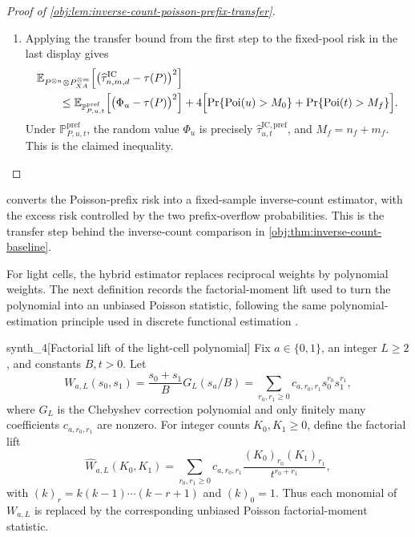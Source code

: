 \documentclass[11pt]{article}
\begin{document}
\begin{proof}[Proof of \cref{obj:lem:inverse-count-poisson-prefix-transfer}]
\begin{enumerate}
\item
Applying the transfer bound from the first step to the fixed-pool risk in the last display gives
\[
\begin{aligned}
&\mathbb E_{P^{\otimes n}\otimes P_{XA}^{\otimes m}}
 \!\left[
  \bigl(\widehat\tau^{\mathrm{IC}}_{n,m,d}-\tau(P)\bigr)^2
 \right] \\
&\qquad\le
\mathbb E_{\mathbb P^{\mathrm{pref}}_{P,u,t}}
 \!\left[
  \bigl(\Phi_u-\tau(P)\bigr)^2
 \right]
+4\Bigl[
  \Pr\{\operatorname{Poi}(u)>M_0\}
  +
  \Pr\{\operatorname{Poi}(t)>M_f\}
\Bigr].
\end{aligned}
\]
Under \(\mathbb P^{\mathrm{pref}}_{P,u,t}\), the random value \(\Phi_u\) is precisely
\(\widehat\tau^{\mathrm{IC,pref}}_{u,t}\), and \(M_f=n_f+m_f\). This is the claimed inequality.
\end{enumerate}
\end{proof}

 converts the Poisson-prefix risk into a fixed-sample inverse-count estimator, with the excess risk controlled by the two prefix-overflow probabilities. This is the transfer step behind the inverse-count comparison in \cref{obj:thm:inverse-count-baseline}.

For light cells, the hybrid estimator replaces reciprocal weights by polynomial weights. The next definition records the factorial-moment lift used to turn the polynomial into an unbiased Poisson statistic, following the same polynomial-estimation principle used in discrete functional estimation \citep{JiaoVenkatHanWeissman2015,WuYang2016,ValiantValiant2017,OrlitskySureshWu2016}.

\begin{definitionv}{synth_4}[Factorial lift of the light-cell polynomial]
Fix \(a\in\{0,1\}\), an integer \(L\ge2\), and constants \(B,t>0\). Let
\[
W_{a,L}(s_0,s_1)
=
\frac{s_0+s_1}{B}G_L(s_a/B)
=
\sum_{r_0,r_1\ge0}c_{a,r_0,r_1}s_0^{r_0}s_1^{r_1},
\]
where \(G_L\) is the Chebyshev correction polynomial and only finitely many coefficients \(c_{a,r_0,r_1}\) are nonzero. For integer counts \(K_0,K_1\ge0\), define the factorial lift
\[
\widehat W_{a,L}(K_0,K_1)
=
\sum_{r_0,r_1\ge0}
c_{a,r_0,r_1}
\frac{(K_0)_{r_0}(K_1)_{r_1}}{t^{r_0+r_1}},
\]
with \((k)_r=k(k-1)\cdots(k-r+1)\) and \((k)_0=1\). Thus each monomial of \(W_{a,L}\) is replaced by the corresponding unbiased Poisson factorial-moment statistic.
\end{definitionv}
\end{document}
